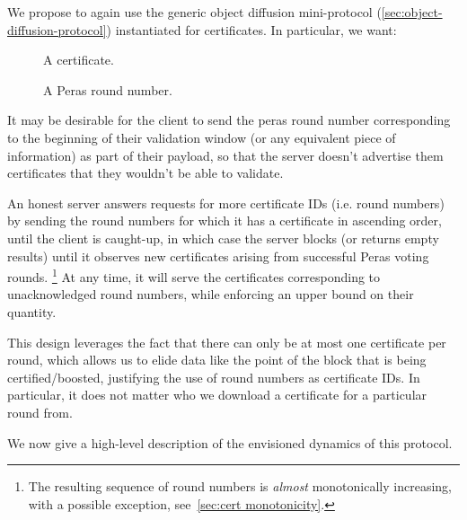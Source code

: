 We propose to again use the generic object diffusion mini-protocol (\cref{sec:object-diffusion-protocol}) instantiated for certificates.
In particular, we want:

\begin{description}
\item []
  A certificate.
\item []
  A Peras round number.
\end{description}

It may be desirable for the client to send the peras round number corresponding to the beginning of their validation window (or any equivalent piece of information) as part of their \MsgInit{} payload, so that the server doesn't advertise them certificates that they wouldn't be able to validate.

An honest server answers requests for more certificate IDs (i.e. round numbers) by sending the round numbers for which it has a certificate in ascending order, until the client is caught-up, in which case the server blocks (or returns empty results) until it observes new certificates arising from successful Peras voting rounds.%
\footnote{The resulting sequence of round numbers is \emph{almost} monotonically increasing, with a possible exception, see~\cref{sec:cert monotonicity}.}
At any time, it will serve the certificates corresponding to unacknowledged round numbers, while enforcing an upper bound on their quantity.

This design leverages the fact that there can only be at most one certificate per round, which allows us to elide data like the point of the block that is being certified/boosted, justifying the use of round numbers as certificate IDs.
In particular, it does not matter who we download a certificate for a particular round from.

We now give a high-level description of the envisioned dynamics of this protocol.

